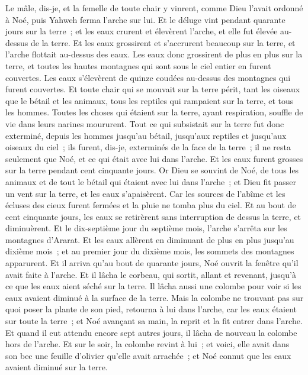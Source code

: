 \begin{multicols}{2}
Le mâle, dis-je, et la femelle de toute chair y vinrent, comme Dieu l'avait ordonné à Noé, puis Yahweh ferma l'arche sur lui.
Et le déluge vint pendant quarante jours sur la terre~; et les eaux crurent et élevèrent l'arche, et elle fut élevée au-dessus de la terre.
Et les eaux grossirent et s'accrurent beaucoup sur la terre, et l'arche flottait au-dessus des eaux.
Les eaux donc grossirent de plus en plus sur la terre, et toutes les hautes montagnes qui sont sous le ciel entier en furent couvertes.
Les eaux s'élevèrent de quinze coudées au-dessus des montagnes qui furent couvertes.
Et toute chair qui se mouvait sur la terre périt, tant les oiseaux que le bétail et les animaux, tous les reptiles qui rampaient sur la terre, et tous les hommes.
Toutes les choses qui étaient sur la terre, ayant respiration, souffle de vie dans leurs narines moururent.
Tout ce qui subsistait sur la terre fut donc exterminé, depuis les hommes jusqu'au bétail, jusqu'aux reptiles et jusqu'aux oiseaux du ciel~; ils furent, dis-je, exterminés de la face de la terre~; il ne resta seulement que Noé, et ce qui était avec lui dans l'arche.
Et les eaux furent grosses sur la terre pendant cent cinquante jours.
\VerseOne{}Or Dieu se souvint de Noé, de tous les animaux et de tout le bétail qui étaient avec lui dans l'arche~; et Dieu fit passer un vent sur la terre, et les eaux s'apaisèrent.
Car les sources de l'abîme et les écluses des cieux furent fermées et la pluie ne tomba plus du ciel.
Et au bout de cent cinquante jours, les eaux se retirèrent sans interruption de dessus la terre, et diminuèrent.
Et le dix-septième jour du septième mois, l'arche s'arrêta sur les montagnes d'Ararat.
Et les eaux allèrent en diminuant de plus en plus jusqu'au dixième mois~; et au premier jour du dixième mois, les sommets des montagnes apparurent.
Et il arriva qu'au bout de quarante jours, Noé ouvrit la fenêtre qu'il avait faite à l'arche.
Et il lâcha le corbeau, qui sortit, allant et revenant, jusqu'à ce que les eaux aient séché sur la terre.
Il lâcha aussi une colombe pour voir si les eaux avaient diminué à la surface de la terre.
Mais la colombe ne trouvant pas sur quoi poser la plante de son pied, retourna à lui dans l'arche, car les eaux étaient sur toute la terre~; et Noé avançant sa main, la reprit et la fit entrer dans l'arche.
Et quand il eut attendu encore sept autres jours, il lâcha de nouveau la colombe hors de l'arche.
Et sur le soir, la colombe revint à lui~; et voici, elle avait dans son bec une feuille d'olivier qu'elle avait arrachée~; et Noé connut que les eaux avaient diminué sur la terre.

\end{multicols}
